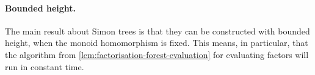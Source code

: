 



\paragraph*{Bounded height.} The main result about Simon trees is that they can be constructed with bounded height, when the monoid homomorphism is fixed. This means, in particular, that the algorithm from \cref{lem:factorisation-forest-evaluation} for evaluating factors will run in constant time.

